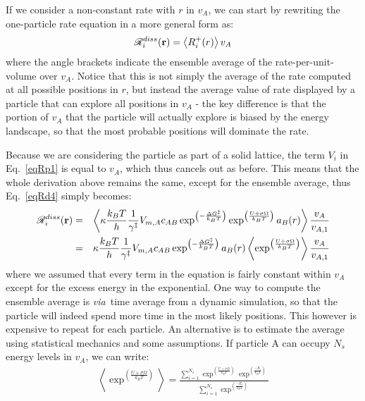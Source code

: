 \documentclass[12pt]{paper}    %
\newcommand{\RR}{\mathscr{R}}
\newcommand{\via}{\textit{via}~}
\newcommand{\eqname}{Eq.~}
\begin{document}
If we consider a non-constant rate with $r$ in $v_A$, we can start by rewriting the one-particle rate equation in a more general form as:
\begin{equation}
\RR^{diss}_i ({\bf r}) = \left\langle R_i^+(r)\right\rangle v_A    \label{eqRd4}
\end{equation}
%
where the angle brackets indicate the ensemble average of the rate-per-unit-volume over $v_A$. Notice that this is not simply the average of the rate computed at all possible positions in $r$, but instead the average value of rate displayed by a particle that can explore all positions in $v_A$ - the key difference is that the portion of $v_A$ that the particle will actually explore is biased by the energy landscape, so that the most probable positions will dominate the rate. 

Because we are considering the particle as part of a solid lattice, the term $V_i$ in \eqname\ref{eqRp1} is equal to $v_A$, which thus cancels out as before. This means that the whole derivation above remains the same, except for the ensemble average, thus \eqname\ref{eqRd4} simply becomes:
%
\begin{eqnarray}
\RR^{diss}_i ({\bf r}) &=& \left\langle \kappa \frac{k_BT}{h} \frac{1}{\gamma^\ddag} V_{m,A} c_{AB}\exp^{\left( - \frac{\Delta G^\ddag}{k_BT}\right)} \exp^{\left( \frac{U + \sigma \Omega}{k_BT}\right)} a_B(r)  \right\rangle \frac{v_A}{v_{A,1}} \nonumber \\
&=&   \kappa \frac{k_BT}{h} \frac{1}{\gamma^\ddag} V_{m,A} c_{AB}\exp^{\left( - \frac{\Delta G^\ddag}{k_BT}\right)} a_B(r) \left\langle \exp^{\left( \frac{U + \sigma \Omega}{k_BT}\right)} \right\rangle  \frac{v_A}{v_{A,1}}
\end{eqnarray}
%
where we assumed that every term in the equation is fairly constant within $v_A$ except for the excess energy in the exponential. One way to compute the ensemble average is \via time average from a dynamic simulation, so that the particle will indeed spend more time in the most likely positions. This however is expensive to repeat for each particle. An alternative is to estimate the average using statistical mechanics and some assumptions. If particle A can occupy $N_s$ energy levels in $v_A$, we can write:
%
\begin{eqnarray}
\left\langle \exp^{\left( \frac{U + \sigma \Omega}{k_BT}\right)} \right\rangle  = \frac{\sum_{i=1}^{N_s} \exp^{\left( \frac{U + \sigma \Omega}{k_BT}\right)} \exp^{\left( \frac{-E_i}{k_BT}\right)}}{\sum_{i=1}^{N_s} \exp^{\left( \frac{-E_i}{k_BT}\right)}}
\end{eqnarray}
\end{document}
